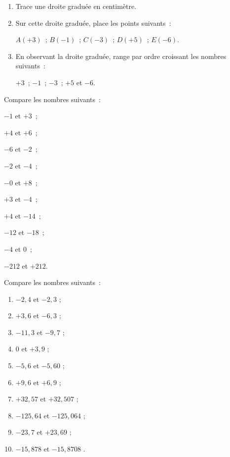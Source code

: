 


\begin{exercice}
\begin{enumerate}
 \item Trace une droite graduée en centimètre.
 \item Sur cette droite graduée, place les points suivants :

\begin{center} $A (+3)$ ; $B (-1)$ ; $C (-3)$ ; $D (+5)$ ; $E (-6)$. \end{center}
 \item En observant la droite graduée, range par ordre croissant les nombres suivants :
 
\begin{center} $+3$ ; $-1$ ; $-3$ ; $+5$ et $-6$.\end{center}
 \end{enumerate}
\end{exercice}


\begin{exercice}
Compare les nombres suivants :
\begin{colenumerate}{2}
 \item $-1$ et $+3$ ;
 \item $+4$ et $+6$ ;
 \item $-6$ et $-2$ ;
 \item $-2$ et $-4$ ;
 \item $-0$ et $+8$ ;
 \item $+3$ et $-4$ ;
 \item $+4$ et $-14$ ;
 \item $-12$ et $-18$ ;
 \item $-4$ et $0$ ;
 \item $-212$ et $+212$.
 \end{colenumerate}
 \end{exercice}
 
 
\begin{exercice}
Compare les nombres suivants :
\begin{enumerate}
 \item $-2,4$ et $-2,3$ \dotfill ;	
 \item $+3,6$ et $-6,3$ \dotfill ;
 \item $-11,3$ et $-9,7$ \dotfill	; 	
 \item $0$ et $+3,9$ \dotfill ; 	
 \item $-5,6$ et $-5,60$ \dotfill ;	 	
 \item $+9,6$ et $+6,9$ \dotfill	;	
 \item $+32,57$ et $+32,507$ \dotfill ;	 	
 \item $-125,64$ et $-125,064$ \dotfill ;	 	
 \item $-23,7$ et $+23,69$ \dotfill ;	
 \item $-15,878$ et $-15,8708$ \dotfill.
  \end{enumerate}
\end{exercice}
 
